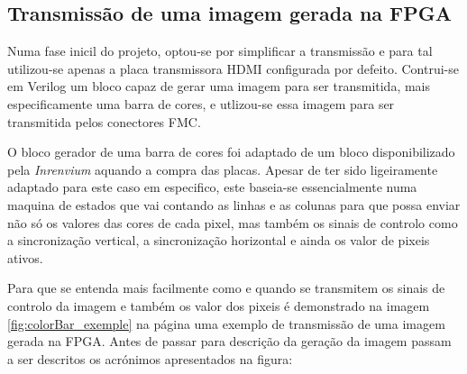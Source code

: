 \subsection{Transmissão de uma imagem gerada na FPGA} \label{subsub:planA}

Numa fase inicil do projeto, optou-se por simplificar a transmissão e para tal utilizou-se apenas a placa transmissora HDMI configurada por defeito. Contrui-se em Verilog um bloco capaz de gerar uma imagem para ser transmitida, mais especificamente uma barra de cores, e utlizou-se essa imagem para ser transmitida pelos conectores FMC.

O bloco gerador de uma barra de cores foi adaptado de um bloco disponibilizado pela \textit{Inrenvium} aquando a compra das placas. Apesar de ter sido ligeiramente adaptado para este caso em especifico, este baseia-se essencialmente numa maquina de estados que vai contando as linhas e as colunas para que possa enviar não só os valores das cores de cada pixel, mas também os sinais de controlo como a sincronização vertical, a sincronização horizontal e ainda os valor de pixeis ativos.

Para que se entenda mais facilmente como e quando se transmitem os sinais de controlo da imagem e também os valor dos pixeis é demonstrado na imagem \ref{fig:colorBar_exemple} na página \pageref{fig:colorBar_exemple} uma exemplo de transmissão de uma imagem gerada na FPGA. Antes de passar para descrição da geração da imagem passam a ser descritos os acrónimos apresentados na figura:

